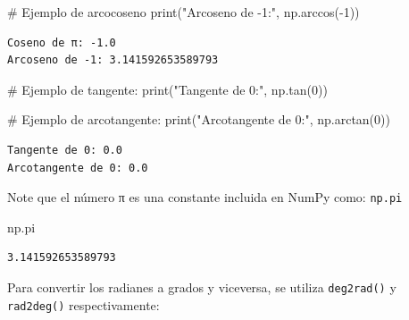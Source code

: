 \documentclass[
  letterpaper,
  DIV=11,
  numbers=noendperiod]{scrreprt}
\newenvironment{Shaded}{\begin{snugshade}}{\end{snugshade}}
\newcommand{\BuiltInTok}[1]{\textcolor[rgb]{0.00,0.23,0.31}{#1}}
\newcommand{\CommentTok}[1]{\textcolor[rgb]{0.37,0.37,0.37}{#1}}
\newcommand{\DecValTok}[1]{\textcolor[rgb]{0.68,0.00,0.00}{#1}}
\newcommand{\NormalTok}[1]{\textcolor[rgb]{0.00,0.23,0.31}{#1}}
\newcommand{\OperatorTok}[1]{\textcolor[rgb]{0.37,0.37,0.37}{#1}}
\newcommand{\StringTok}[1]{\textcolor[rgb]{0.13,0.47,0.30}{#1}}
\begin{document}
\begin{tcolorbox}
\begin{Shaded}
\begin{Highlighting}[]
\CommentTok{\# Ejemplo de arcocoseno}
\BuiltInTok{print}\NormalTok{(}\StringTok{"Arcoseno de {-}1:"}\NormalTok{, np.arccos(}\OperatorTok{{-}}\DecValTok{1}\NormalTok{))}
\end{Highlighting}
\end{Shaded}

\begin{verbatim}
Coseno de π: -1.0
Arcoseno de -1: 3.141592653589793
\end{verbatim}

\begin{Shaded}
\begin{Highlighting}[]
\CommentTok{\# Ejemplo de tangente:}
\BuiltInTok{print}\NormalTok{(}\StringTok{"Tangente de 0:"}\NormalTok{, np.tan(}\DecValTok{0}\NormalTok{))}

\CommentTok{\# Ejemplo de arcotangente:}
\BuiltInTok{print}\NormalTok{(}\StringTok{"Arcotangente de 0:"}\NormalTok{, np.arctan(}\DecValTok{0}\NormalTok{))}
\end{Highlighting}
\end{Shaded}

\begin{verbatim}
Tangente de 0: 0.0
Arcotangente de 0: 0.0
\end{verbatim}

\begin{tcolorbox}[enhanced jigsaw, opacitybacktitle=0.6, toptitle=1mm, toprule=.15mm, arc=.35mm, breakable, bottomrule=.15mm, opacityback=0, leftrule=.75mm, rightrule=.15mm, title=\textcolor{quarto-callout-note-color}{\faInfo}\hspace{0.5em}{Note}, left=2mm, bottomtitle=1mm, colframe=quarto-callout-note-color-frame, colback=white, titlerule=0mm, coltitle=black, colbacktitle=quarto-callout-note-color!10!white]

Note que el número π es una constante incluida en NumPy como:
\texttt{np.pi}

\end{tcolorbox}

\begin{Shaded}
\begin{Highlighting}[]
\NormalTok{np.pi}
\end{Highlighting}
\end{Shaded}

\begin{verbatim}
3.141592653589793
\end{verbatim}

Para convertir los radianes a grados y viceversa, se utiliza
\texttt{deg2rad()} y \texttt{rad2deg()} respectivamente:


\end{tcolorbox}
\end{document}
